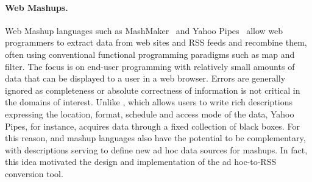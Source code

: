 
\paragraph*{Web Mashups.}
Web Mashup languages such as MashMaker~\cite{ennals+:mashmaker} 
and Yahoo Pipes~\cite{yahoopipes} allow web programmers to
extract data from web sites and RSS feeds and recombine them,
often using conventional functional programming paradigms such as
map and filter.  The focus is on end-user programming with relatively
small amounts of data that can be displayed to a user in a web
browser. Errors are generally ignored as completeness or absolute 
correctness of information is not critical in the domains of interest.
Unlike \padsd{}, which allows users to write rich descriptions
expressing the location, format, schedule and access mode of the data, 
Yahoo Pipes, for instance, acquires data through a fixed collection of 
black boxes.  For this reason, \padsd{} and mashup languages also have the 
potential to be complementary, with \padsd{} descriptions
serving to define new ad hoc data sources for mashups.  In fact, this
idea motivated the design and implementation of the \padsd{} ad
hoc-to-RSS conversion tool. 

